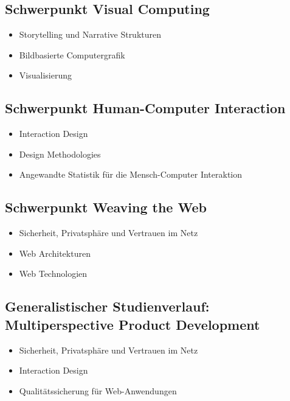 \subsection{Schwerpunkt Visual
Computing}\label{schwerpunkt-visual-computing}

\begin{itemize}
\tightlist
\item
  Storytelling und Narrative Strukturen
\item
  Bildbasierte Computergrafik
\item
  Visualisierung
\end{itemize}

\subsection{Schwerpunkt Human-Computer
Interaction}\label{schwerpunkt-human-computer-interaction}

\begin{itemize}
\tightlist
\item
  Interaction Design
\item
  Design Methodologies
\item
  Angewandte Statistik für die Mensch-Computer Interaktion
\end{itemize}

\subsection{Schwerpunkt Weaving the
Web}\label{schwerpunkt-weaving-the-web}

\begin{itemize}
\tightlist
\item
  Sicherheit, Privatsphäre und Vertrauen im Netz
\item
  Web Architekturen
\item
  Web Technologien
\end{itemize}

\subsection{Generalistischer Studienverlauf: Multiperspective Product
Development}\label{generalistischer-studienverlauf-multiperspective-product-development}

\begin{itemize}
\tightlist
\item
  Sicherheit, Privatsphäre und Vertrauen im Netz
\item
  Interaction Design
\item
  Qualitätssicherung für Web-Anwendungen
\end{itemize}

